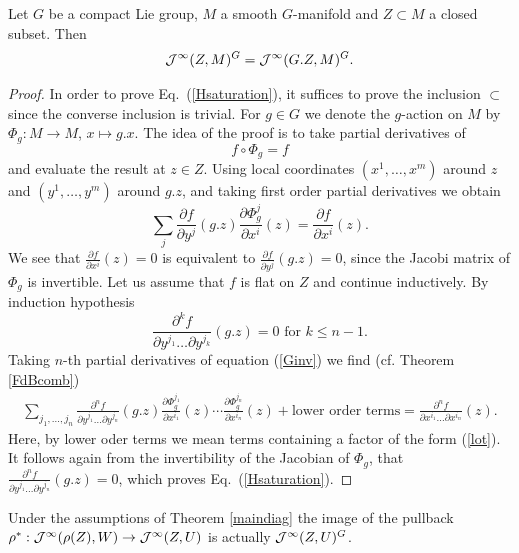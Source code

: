 \begin{proposition}
\label{BSrefinement}
Let $G$ be a compact Lie group, $M$ a smooth $G$-manifold and $Z\subset M$ a 
closed subset. Then 
\begin{eqnarray}\label{Hsaturation}
  \mathcal{J}^\infty(Z,M)^G=\mathcal{J}^\infty(G.Z,M)^G.
\end{eqnarray}
\end{proposition}

\begin{proof} In order to prove Eq.~(\ref{Hsaturation}), it suffices to prove the 
inclusion $\subset$ since the converse inclusion is trivial. 
For $g\in G$ we denote the $g$-action on $M$ by $\Phi_g : M \to M$, $x \mapsto g.x $. 
The idea of the proof is to take partial derivatives of 
\begin{equation}\label{Ginv}
  f\circ\Phi_g=f
\end{equation}
and evaluate the result at $z\in Z$. Using local coordinates $(x^1,\dots,x^m)$ 
around $z$ and $(y^1,\dots,y^m)$ around $g.z$, and taking first order partial 
derivatives we obtain
\[
  \sum_j\frac{\partial f}{\partial y^j}(g.z)\frac{\partial \Phi^j_g}{\partial x^i}(z)=
  \frac{\partial f}{\partial x^i}(z).
\]
We see that $\frac{\partial f}{\partial x^i}(z)=0$ is equivalent to 
$\frac{\partial f}{\partial y^j}(g.z)=0$, since the Jacobi matrix of $\Phi_g$ is invertible. 
Let us assume that $f$ is flat on $Z$ and continue inductively. By induction hypothesis 
\begin{equation}\label{lot}
  \frac{\partial^k f}{\partial y^{j_1}\dots \partial y^{j_k}}(g.z)=0 \mbox{ for }k\le n-1.
\end{equation}
Taking $n$-th partial derivatives of equation (\ref{Ginv}) we find (cf. Theorem \ref{FdBcomb})
\begin{eqnarray*}
  \sum_{j_1,\dots,j_n}\frac{\partial^n f}{\partial y^{j_1}\dots \partial y^{j_n}}(g.z)
  \frac{\partial \Phi^{j_1}_g}{\partial x^{i_1}}(z)\cdots
  \frac{\partial \Phi^{j_n}_g}{\partial x^{i_n}}(z)+\text{lower order terms}
  =\frac{\partial^n f}{\partial x^{i_1}\dots \partial x^{i_n}}(z).
\end{eqnarray*}
Here, by lower oder terms we mean terms containing  a factor of the form (\ref{lot}). 
It follows again from the invertibility of the Jacobian of $\Phi_g$, that 
$\frac{\partial^n f}{\partial y^{j_1}\dots \partial y^{j_n}}(g.z)=0$, which proves 
Eq.~(\ref{Hsaturation}).
\end{proof}

\begin{proposition} \label{flatalongZ} Under the assumptions of Theorem \ref{maindiag}
the image of the pullback 
$\rho^*:\mathcal{J}^\infty(\rho(Z),W)\to \mathcal{J}^\infty(Z,U)$ is actually $\mathcal{J}^\infty(Z,U)^G$.
\end{proposition}

